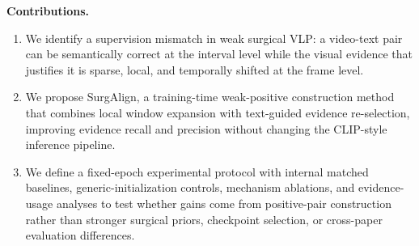 \noindent\textbf{Contributions.}
\begin{enumerate}
    \item We identify a supervision mismatch in weak surgical VLP: a video-text pair can be semantically correct at the interval level while the visual evidence that justifies it is sparse, local, and temporally shifted at the frame level.
    \item We propose SurgAlign, a training-time weak-positive construction method that combines local window expansion with text-guided evidence re-selection, improving evidence recall and precision without changing the CLIP-style inference pipeline.
    \item We define a fixed-epoch experimental protocol with internal matched baselines, generic-initialization controls, mechanism ablations, and evidence-usage analyses to test whether gains come from positive-pair construction rather than stronger surgical priors, checkpoint selection, or cross-paper evaluation differences.
\end{enumerate}
